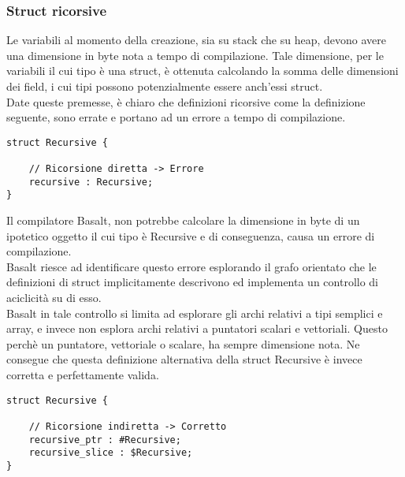 \subsubsection{Struct ricorsive}
Le variabili al momento della creazione, sia su stack che su heap, devono avere una dimensione 
in byte nota a tempo di compilazione. Tale dimensione, per le variabili il cui tipo è una struct, 
è ottenuta calcolando la somma delle dimensioni dei field, i cui tipi possono potenzialmente 
essere anch’essi struct. \\ 

Date queste premesse, è chiaro che definizioni ricorsive come la definizione seguente, 
sono errate e portano ad un errore a tempo di compilazione. \\

\vspace{0.5cm}
\begin{lstlisting}[frame=single]
struct Recursive {

    // Ricorsione diretta -> Errore
    recursive : Recursive;
}
\end{lstlisting}
\vspace{0.5cm}

 
Il compilatore Basalt, non potrebbe calcolare la dimensione in byte di un ipotetico oggetto il cui tipo è 
Recursive e di conseguenza, causa un errore di compilazione. \\ 

Basalt riesce ad identificare questo errore esplorando il grafo orientato che le definizioni di struct implicitamente 
descrivono ed implementa un controllo di aciclicità su di esso. \\

Basalt in tale controllo si limita ad esplorare gli archi relativi a tipi semplici e array, 
e invece non esplora archi relativi a puntatori scalari e vettoriali. Questo perchè un puntatore, 
vettoriale o scalare, ha sempre dimensione nota. Ne consegue che questa definizione alternativa 
della struct Recursive è invece corretta e perfettamente valida. \\

\vspace{0.5cm}
\begin{lstlisting}[frame=single]
struct Recursive {

    // Ricorsione indiretta -> Corretto
    recursive_ptr : #Recursive;
    recursive_slice : $Recursive;
}
\end{lstlisting}
\vspace{0.5cm}